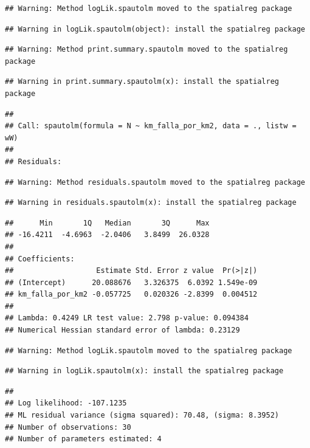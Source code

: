 \documentclass[11pt,]{article}
\begin{document}
\begin{verbatim}
## Warning: Method logLik.spautolm moved to the spatialreg package
\end{verbatim}

\begin{verbatim}
## Warning in logLik.spautolm(object): install the spatialreg package
\end{verbatim}

\begin{verbatim}
## Warning: Method print.summary.spautolm moved to the spatialreg package
\end{verbatim}

\begin{verbatim}
## Warning in print.summary.spautolm(x): install the spatialreg package
\end{verbatim}

\begin{verbatim}
## 
## Call: spautolm(formula = N ~ km_falla_por_km2, data = ., listw = wW)
## 
## Residuals:
\end{verbatim}

\begin{verbatim}
## Warning: Method residuals.spautolm moved to the spatialreg package
\end{verbatim}

\begin{verbatim}
## Warning in residuals.spautolm(x): install the spatialreg package
\end{verbatim}

\begin{verbatim}
##      Min       1Q   Median       3Q      Max 
## -16.4211  -4.6963  -2.0406   3.8499  26.0328 
## 
## Coefficients: 
##                   Estimate Std. Error z value  Pr(>|z|)
## (Intercept)      20.088676   3.326375  6.0392 1.549e-09
## km_falla_por_km2 -0.057725   0.020326 -2.8399  0.004512
## 
## Lambda: 0.4249 LR test value: 2.798 p-value: 0.094384 
## Numerical Hessian standard error of lambda: 0.23129
\end{verbatim}

\begin{verbatim}
## Warning: Method logLik.spautolm moved to the spatialreg package
\end{verbatim}

\begin{verbatim}
## Warning in logLik.spautolm(x): install the spatialreg package
\end{verbatim}

\begin{verbatim}
## 
## Log likelihood: -107.1235 
## ML residual variance (sigma squared): 70.48, (sigma: 8.3952)
## Number of observations: 30 
## Number of parameters estimated: 4
\end{verbatim}
\end{document}
